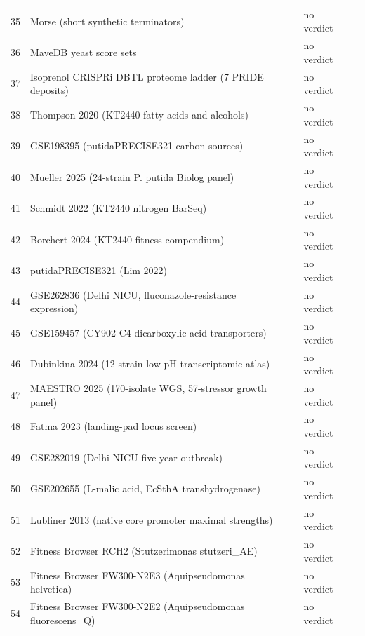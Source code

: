 \begin{longtable}{@{}r L{76mm} L{20mm} L{36mm} L{24mm}@{}}
35 & Morse (short synthetic terminators) &  & no verdict &  \\
36 & MaveDB yeast score sets &  & no verdict &  \\
37 & Isoprenol CRISPRi DBTL proteome ladder (7 PRIDE deposits) &  & no verdict &  \\
38 & Thompson 2020 (KT2440 fatty acids and alcohols) &  & no verdict &  \\
39 & GSE198395 (putidaPRECISE321 carbon sources) &  & no verdict &  \\
40 & Mueller 2025 (24-strain P. putida Biolog panel) &  & no verdict &  \\
41 & Schmidt 2022 (KT2440 nitrogen BarSeq) &  & no verdict &  \\
42 & Borchert 2024 (KT2440 fitness compendium) &  & no verdict &  \\
43 & putidaPRECISE321 (Lim 2022) &  & no verdict &  \\
44 & GSE262836 (Delhi NICU, fluconazole-resistance expression) &  & no verdict &  \\
45 & GSE159457 (CY902 C4 dicarboxylic acid transporters) &  & no verdict &  \\
46 & Dubinkina 2024 (12-strain low-pH transcriptomic atlas) &  & no verdict &  \\
47 & MAESTRO 2025 (170-isolate WGS, 57-stressor growth panel) &  & no verdict &  \\
48 & Fatma 2023 (landing-pad locus screen) &  & no verdict &  \\
49 & GSE282019 (Delhi NICU five-year outbreak) &  & no verdict &  \\
50 & GSE202655 (L-malic acid, EcSthA transhydrogenase) &  & no verdict &  \\
51 & Lubliner 2013 (native core promoter maximal strengths) &  & no verdict &  \\
52 & Fitness Browser RCH2 (Stutzerimonas stutzeri\_AE) &  & no verdict &  \\
53 & Fitness Browser FW300-N2E3 (Aquipseudomonas helvetica) &  & no verdict &  \\
54 & Fitness Browser FW300-N2E2 (Aquipseudomonas fluorescens\_Q) &  & no verdict &  \\

\end{longtable}
